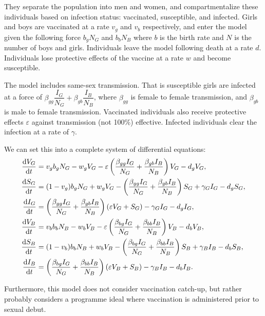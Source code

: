 \documentclass[12pt]{article}
\begin{document}
They separate the population into men and women, and compartmentalize these individuals based on infection status: vaccinated, susceptible, and infected. Girls and boys are vaccinated at a rate $v_g$ and $v_b$ respectively, and enter the model given the following force $b_gN_G$ and $b_bN_B$ where $b$ is the birth rate and $N$ is the number of boys and girls. Individuals leave the model following death at a rate $d$. Individuals lose protective effects of the vaccine at a rate $w$ and become susceptible.  

The model includes same-sex transmission.  That is susceptible girls are infected at a force of $\beta_{gg}\dfrac{I_G}{N_G} + \beta_{gb}\dfrac{I_B}{N_B}$, where $\beta_{gg}$ is female to female transmission, and $\beta_{gb}$ is male to female transmission. Vaccinated individuals also receive protective effects $\varepsilon$ against transmission (not 100\%) effective.  Infected individuals clear the infection at a rate of $\gamma$.  

We can set this into a complete system of differential equations:
\begin{align}
\frac{\mathrm{d}V_G}{\mathrm{d}t}&=v_gb_gN_G - w_gV_G - \varepsilon\left(\frac{\beta_{gg}I_G}{N_G}+\frac{\beta_{gb}I_B}{N_B}\right)V_G - d_gV_G,\\
\frac{\mathrm{d}S_G}{\mathrm{d}t}&=(1-v_g)b_gN_G + w_gV_G - \left(\frac{\beta_{gg}I_G}{N_G}+\frac{\beta_{gb}I_B}{N_B}\right)S_G  + \gamma_G I_G - d_gS_G,\\
\frac{\mathrm{d}I_G}{\mathrm{d}t}&= \left(\frac{\beta_{gg}I_G}{N_G}+\frac{\beta_{gb}I_B}{N_B}\right)(\varepsilon V_G + S_G) - \gamma_G I_G - d_gI_G,\\
\frac{\mathrm{d}V_B}{\mathrm{d}t}&=v_bb_bN_B - w_bV_B - \varepsilon\left(\frac{\beta_{bg}I_G}{N_G}+\frac{\beta_{bb}I_B}{N_B}\right)V_B - d_bV_B,\\
\frac{\mathrm{d}S_B}{\mathrm{d}t}&=(1-v_b)b_bN_B + w_bV_B - \left(\frac{\beta_{bg}I_G}{N_G}+\frac{\beta_{bb}I_B}{N_B}\right)S_B  + \gamma_B I_B - d_bS_B,\\
\frac{\mathrm{d}I_B}{\mathrm{d}t}&= \left(\frac{\beta_{bg}I_G}{N_G}+\frac{\beta_{bb}I_B}{N_B}\right)(\varepsilon V_B + S_B) - \gamma_B I_B - d_bI_B.
\end{align}

Furthermore, this model does not consider vaccination catch-up, but rather probably considers a programme ideal where vaccination is administered prior to sexual debut.  


\newpage


\end{document}

